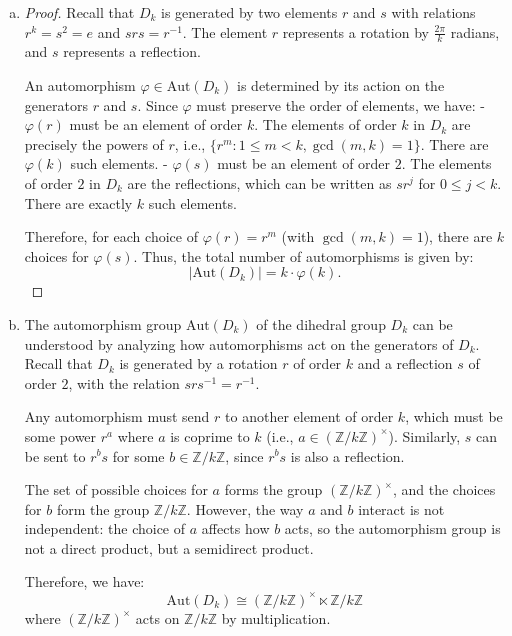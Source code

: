 \documentclass{article}
\begin{document}
\begin{enumerate}[(a)]
    \item \begin{proof}
        Recall that $D_k$ is generated by two elements $r$ and $s$ with relations $r^k = s^2 = e$ and $srs = r^{-1}$. The element $r$ represents a rotation by $\frac{2\pi}{k}$ radians, and $s$ represents a reflection.

        An automorphism $\varphi \in \text{Aut}(D_k)$ is determined by its action on the generators $r$ and $s$. Since $\varphi$ must preserve the order of elements, we have:
        - $\varphi(r)$ must be an element of order $k$. The elements of order $k$ in $D_k$ are precisely the powers of $r$, i.e., $\{r^m : 1 \leq m < k, \gcd(m, k) = 1\}$. There are $\varphi(k)$ such elements.
        - $\varphi(s)$ must be an element of order $2$. The elements of order $2$ in $D_k$ are the reflections, which can be written as $sr^j$ for $0 \leq j < k$. There are exactly $k$ such elements.

        Therefore, for each choice of $\varphi(r) = r^m$ (with $\gcd(m, k) = 1$), there are $k$ choices for $\varphi(s)$. Thus, the total number of automorphisms is given by:
        \[
        |\text{Aut}(D_k)| = k \cdot \varphi(k).
        \]
    \end{proof}
    \item The automorphism group $\text{Aut}(D_k)$ of the dihedral group $D_k$ can be understood by analyzing how automorphisms act on the generators of $D_k$. Recall that $D_k$ is generated by a rotation $r$ of order $k$ and a reflection $s$ of order $2$, with the relation $s r s^{-1} = r^{-1}$.

    Any automorphism must send $r$ to another element of order $k$, which must be some power $r^a$ where $a$ is coprime to $k$ (i.e., $a \in (\mathbb{Z}/k\mathbb{Z})^\times$). Similarly, $s$ can be sent to $r^b s$ for some $b \in \mathbb{Z}/k\mathbb{Z}$, since $r^b s$ is also a reflection.

    The set of possible choices for $a$ forms the group $(\mathbb{Z}/k\mathbb{Z})^\times$, and the choices for $b$ form the group $\mathbb{Z}/k\mathbb{Z}$. However, the way $a$ and $b$ interact is not independent: the choice of $a$ affects how $b$ acts, so the automorphism group is not a direct product, but a semidirect product.

    Therefore, we have:
    \[
    \text{Aut}(D_k) \cong (\mathbb{Z}/k\mathbb{Z})^\times \ltimes \mathbb{Z}/k\mathbb{Z}
    \]
    where $(\mathbb{Z}/k\mathbb{Z})^\times$ acts on $\mathbb{Z}/k\mathbb{Z}$ by multiplication.  
\end{enumerate}
\end{document}
